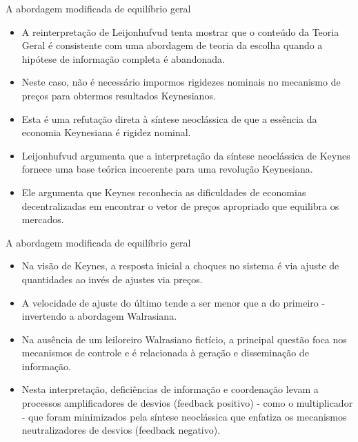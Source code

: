 \documentclass[10pt]{beamer}
\begin{document}
\begin{frame}{A abordagem modificada de equilíbrio geral}
    \begin{itemize}
        \item A reinterpretação de Leijonhufvud tenta mostrar que o conteúdo da Teoria Geral é consistente com uma abordagem de teoria da escolha quando a hipótese de informação completa é abandonada.
        \bigskip
        \item Neste caso, não é necessário impormos rigidezes nominais no mecanismo de preços para obtermos resultados Keynesianos.
        \bigskip
        \item Esta é uma refutação direta à síntese neoclássica de que a essência da economia Keynesiana é rigidez nominal.
        \bigskip
        \item Leijonhufvud argumenta que a interpretação da síntese neoclássica de Keynes fornece uma base teórica incoerente para uma revolução Keynesiana.
        \bigskip
        \item Ele argumenta que Keynes reconhecia as dificuldades de economias decentralizadas em encontrar o vetor de preços apropriado que equilibra os mercados.
    \end{itemize}
\end{frame}

\begin{frame}{A abordagem modificada de equilíbrio geral}
    \begin{itemize}
        \item Na visão de Keynes, a resposta inicial a choques no sistema é via ajuste de quantidades ao invés de ajustes via preços.
        \bigskip
        \item A velocidade de ajuste do último tende a ser menor que a do primeiro - invertendo a abordagem Walrasiana.
        \bigskip
        \item Na ausência de um leiloreiro Walrasiano fictício, a principal questão foca nos mecanismos de controle e é relacionada à geração e disseminação de informação.
        \bigskip
        \item Nesta interpretação, deficiências de informação e coordenação levam a processos amplificadores de desvios (feedback positivo) - como o multiplicador - que foram minimizados pela síntese neoclássica que enfatiza os mecanismos neutralizadores de desvios (feedback negativo).
    \end{itemize}
\end{frame}
\end{document}
